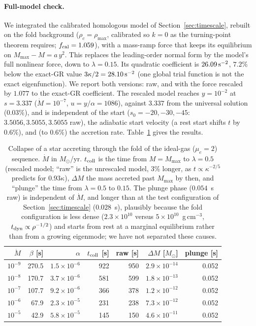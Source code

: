 \documentclass[11pt]{article}
\begin{document}
\paragraph{Full-model check.} We integrated the calibrated homologous model of Section~\ref{sec:timescale}, rebuilt on the fold background ($\rho_c=\rho_{\max}$, calibrated so $k=0$ as the turning-point theorem requires; $f_{\rm cal}=1.059$), with a mass-ramp force that keeps its equilibrium on $M_{\max}-M=a\,y^2$. This replaces the leading-order normal form by the model's full nonlinear force, down to $\lambda=0.15$. Its quadratic coefficient is $26.09\,{\rm s^{-2}}$, $7.2\%$ below the exact-GR value $3\kappa/2=28.10\,{\rm s^{-2}}$ (one global trial function is not the exact eigenfunction). We report both versions: raw, and with the force rescaled by $1.077$ to the exact-GR coefficient. The rescaled model reaches $y=10^{-2}$ at $s=3.337$ ($\dot M=10^{-7}$, $u=y/\alpha=1086$), against $3.337$ from the universal solution ($0.03\%$), and is independent of the start ($s_0=-20,-30,-45$: $3.5056,3.5055,3.5055$ raw), the adiabatic start velocity (a rest start shifts $t$ by $0.6\%$), and (to $0.6\%$) the accretion rate. Table~\ref{tab:fold} gives the results.
\begin{table}[ht]
\centering\footnotesize
\begin{tabular}{rrrrrrr}
\hline
$\dot M$ & $\beta$ [s] & $\alpha$ & $t_{\rm coll}$ [s] & raw [s] & $\Delta M$ [$M_\odot$] & plunge [s]\\
\hline
$10^{-9}$ & 270.5 & $1.5\times10^{-6}$ & 922 & 950 & $2.9\times10^{-14}$ & 0.052\\
$10^{-8}$ & 170.7 & $3.7\times10^{-6}$ & 581 & 599 & $1.8\times10^{-13}$ & 0.052\\
$10^{-7}$ & 107.7 & $9.2\times10^{-6}$ & 366 & 378 & $1.2\times10^{-12}$ & 0.052\\
$10^{-6}$ & 67.9 & $2.3\times10^{-5}$ & 231 & 238 & $7.3\times10^{-12}$ & 0.052\\
$10^{-5}$ & 42.9 & $5.8\times10^{-5}$ & 145 & 150 & $4.6\times10^{-11}$ & 0.052\\
\hline
\end{tabular}
\caption{Collapse of a star accreting through the fold of the ideal-gas ($\mu_e=2$) sequence. $\dot M$ in $M_\odot$/yr. $t_{\rm coll}$ is the time from $M=M_{\max}$ to $\lambda=0.5$ (rescaled model; ``raw'' is the unrescaled model, 3\% longer, as $t\propto\kappa^{-2/5}$ predicts for $0.93\kappa$), $\Delta M$ the mass accreted past $M_{\max}$ by then, and ``plunge'' the time from $\lambda=0.5$ to $0.15$. The plunge phase ($0.054$~s raw) is independent of $\dot M$, and longer than at the test configuration of Section~\ref{sec:timescale} ($0.028$~s), plausibly because the fold configuration is less dense ($2.3\times10^{10}$ versus $5\times10^{10}$~g\,cm$^{-3}$, $t_{\rm dyn}\propto\rho^{-1/2}$) and starts from rest at a marginal equilibrium rather than from a growing eigenmode; we have not separated these causes.}
\label{tab:fold}
\end{table}
\end{document}
